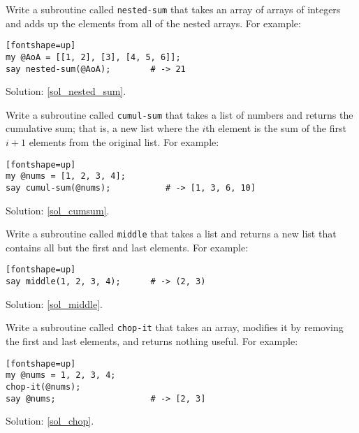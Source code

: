 \begin{exercise}

Write a subroutine called \verb"nested-sum" that takes an 
array of arrays of integers and adds up the elements from all of the nested arrays. For example:
\label{nested_sum}

\begin{verbatim}[fontshape=up]
my @AoA = [[1, 2], [3], [4, 5, 6]];
say nested-sum(@AoA);        # -> 21
\end{verbatim}

Solution: \ref{sol_nested_sum}.

\end{exercise}

\begin{exercise}
\label{cumulative}

Write a subroutine called {\tt cumul-sum} that takes a list of numbers 
and returns the cumulative sum; that is, a new list where the 
$i$th element is the sum of the first $i+1$ elements from 
the original list. For example:
\label{cumsum}

\begin{verbatim}[fontshape=up]
my @nums = [1, 2, 3, 4];
say cumul-sum(@nums);           # -> [1, 3, 6, 10]
\end{verbatim}

Solution: \ref{sol_cumsum}.

\end{exercise}

\begin{exercise}

Write a subroutine called \verb"middle" that takes a list and
returns a new list that contains all but the first and last
elements.  For example:
\label{middle}

\begin{verbatim}[fontshape=up]
say middle(1, 2, 3, 4);      # -> (2, 3)
\end{verbatim}

Solution: \ref{sol_middle}.

\end{exercise}

\begin{exercise}

Write a subroutine called \verb"chop-it" that takes 
an array, modifies it by removing the first and last 
elements, and returns nothing useful. For example:
\label{chop}

\begin{verbatim}[fontshape=up]
my @nums = 1, 2, 3, 4;
chop-it(@nums);
say @nums;                   # -> [2, 3]
\end{verbatim}

Solution: \ref{sol_chop}.

\end{exercise}


